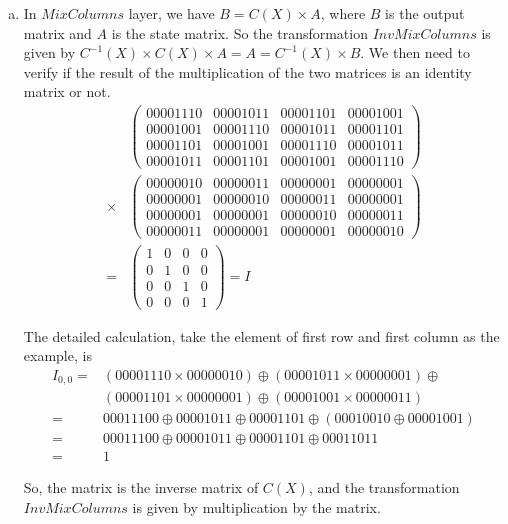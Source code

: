 \documentclass[11pt,a4paper]{article}
\begin{document}
\begin{enumerate}
\begin{enumerate}[(a)]
		\item In $\mathit{MixColumns}$ layer, we have $B = C(X) \times A$, where $B$ is the output matrix and $A$ is the state matrix. So the transformation $\mathit{InvMixColumns}$ is given by $C^{-1}(X) \times C(X) \times A = A = C^{-1}(X) \times B$. We then need to verify if the result of the multiplication of the two matrices is an identity matrix or not.
		\begin{align*}
			& \begin{pmatrix}
				00001110 & 00001011 & 00001101 & 00001001 \\
				00001001 & 00001110 & 00001011 & 00001101 \\
				00001101 & 00001001 & 00001110 &  00001011 \\
				00001011 & 00001101 & 00001001 & 00001110
			\end{pmatrix} \\
			\times &
			\begin{pmatrix}
				00000010 & 00000011 & 00000001 & 00000001 \\
				00000001 & 00000010 & 00000011 & 00000001 \\
				00000001 & 00000001 & 00000010 & 00000011 \\
				00000011 & 00000001 & 00000001 & 00000010
			\end{pmatrix} \\
			= &
			\begin{pmatrix}
				1 & 0 & 0 & 0 \\
				0 & 1 & 0 & 0 \\
				0 & 0 & 1 & 0 \\
				0 & 0 & 0 & 1
			\end{pmatrix}
			= I
		\end{align*}
		\par The detailed calculation, take the element of first row and first column as the example, is 
		\begin{align*}
			I_{0, 0} =& (00001110 \times 00000010) \oplus (00001011 \times 00000001) \oplus \\
			& (00001101 \times 00000001) \oplus (00001001 \times 00000011) \\
			=& 00011100 \oplus 00001011 \oplus 00001101 \oplus (00010010 \oplus 00001001) \\
			=& 00011100 \oplus 00001011 \oplus 00001101 \oplus 00011011 \\
			=& 1
		\end{align*}
		\par So, the matrix is the inverse matrix of $C(X)$, and the transformation $\mathit{InvMixColumns}$ is given by multiplication by the matrix.
	\end{enumerate}
	

\end{enumerate}
\end{document}
